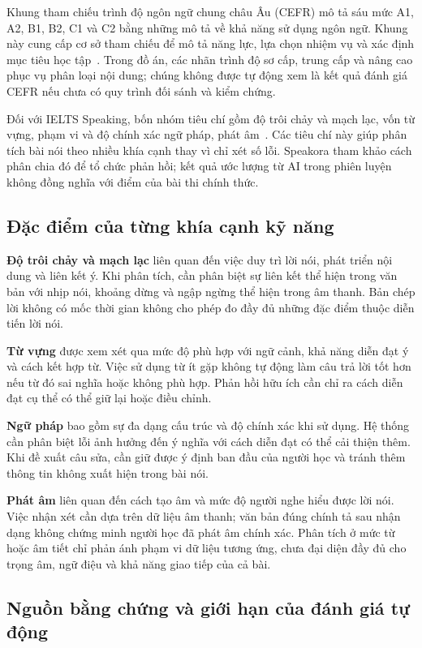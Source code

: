 \documentclass[12pt,a4paper,oneside]{report}
\begin{document}
Khung tham chiếu trình độ ngôn ngữ chung châu Âu (CEFR) mô tả sáu mức A1, A2, B1, B2, C1 và C2 bằng những mô tả về khả năng sử dụng ngôn ngữ. Khung này cung cấp cơ sở tham chiếu để mô tả năng lực, lựa chọn nhiệm vụ và xác định mục tiêu học tập~\cite{cefr}. Trong đồ án, các nhãn trình độ sơ cấp, trung cấp và nâng cao phục vụ phân loại nội dung; chúng không được tự động xem là kết quả đánh giá CEFR nếu chưa có quy trình đối sánh và kiểm chứng.

Đối với IELTS Speaking, bốn nhóm tiêu chí gồm độ trôi chảy và mạch lạc, vốn từ vựng, phạm vi và độ chính xác ngữ pháp, phát âm~\cite{ielts-speaking}. Các tiêu chí này giúp phân tích bài nói theo nhiều khía cạnh thay vì chỉ xét số lỗi. Speakora tham khảo cách phân chia đó để tổ chức phản hồi; kết quả ước lượng từ AI trong phiên luyện không đồng nghĩa với điểm của bài thi chính thức.

\subsection{Đặc điểm của từng khía cạnh kỹ năng}

\textbf{Độ trôi chảy và mạch lạc} liên quan đến việc duy trì lời nói, phát triển nội dung và liên kết ý. Khi phân tích, cần phân biệt sự liên kết thể hiện trong văn bản với nhịp nói, khoảng dừng và ngập ngừng thể hiện trong âm thanh. Bản chép lời không có mốc thời gian không cho phép đo đầy đủ những đặc điểm thuộc diễn tiến lời nói.

\textbf{Từ vựng} được xem xét qua mức độ phù hợp với ngữ cảnh, khả năng diễn đạt ý và cách kết hợp từ. Việc sử dụng từ ít gặp không tự động làm câu trả lời tốt hơn nếu từ đó sai nghĩa hoặc không phù hợp. Phản hồi hữu ích cần chỉ ra cách diễn đạt cụ thể có thể giữ lại hoặc điều chỉnh.

\textbf{Ngữ pháp} bao gồm sự đa dạng cấu trúc và độ chính xác khi sử dụng. Hệ thống cần phân biệt lỗi ảnh hưởng đến ý nghĩa với cách diễn đạt có thể cải thiện thêm. Khi đề xuất câu sửa, cần giữ được ý định ban đầu của người học và tránh thêm thông tin không xuất hiện trong bài nói.

\textbf{Phát âm} liên quan đến cách tạo âm và mức độ người nghe hiểu được lời nói. Việc nhận xét cần dựa trên dữ liệu âm thanh; văn bản đúng chính tả sau nhận dạng không chứng minh người học đã phát âm chính xác. Phân tích ở mức từ hoặc âm tiết chỉ phản ánh phạm vi dữ liệu tương ứng, chưa đại diện đầy đủ cho trọng âm, ngữ điệu và khả năng giao tiếp của cả bài.

\subsection{Nguồn bằng chứng và giới hạn của đánh giá tự động}
\end{document}
